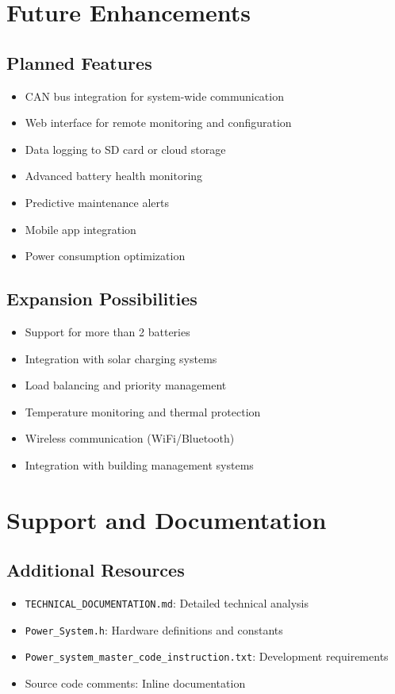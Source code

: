 \documentclass[11pt,a4paper]{article}
\begin{document}
\section{Future Enhancements}

\subsection{Planned Features}
\begin{itemize}
    \item CAN bus integration for system-wide communication
    \item Web interface for remote monitoring and configuration
    \item Data logging to SD card or cloud storage
    \item Advanced battery health monitoring
    \item Predictive maintenance alerts
    \item Mobile app integration
    \item Power consumption optimization
\end{itemize}

\subsection{Expansion Possibilities}
\begin{itemize}
    \item Support for more than 2 batteries
    \item Integration with solar charging systems
    \item Load balancing and priority management
    \item Temperature monitoring and thermal protection
    \item Wireless communication (WiFi/Bluetooth)
    \item Integration with building management systems
\end{itemize}

\section{Support and Documentation}

\subsection{Additional Resources}
\begin{itemize}
    \item \texttt{TECHNICAL\_DOCUMENTATION.md}: Detailed technical analysis
    \item \texttt{Power\_System.h}: Hardware definitions and constants
    \item \texttt{Power\_system\_master\_code\_instruction.txt}: Development requirements
    \item Source code comments: Inline documentation
\end{itemize}
\end{document}
